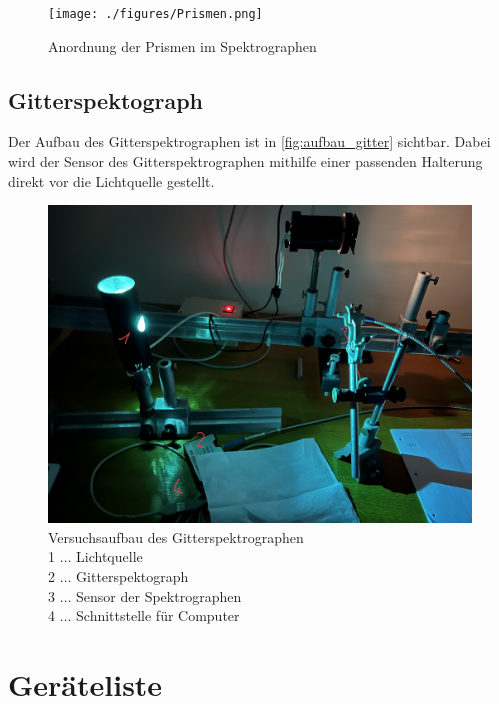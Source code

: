 \documentclass[12pt,english,ngerman]{scrartcl}
\begin{document}
\begin{figure}[H]
	\begin{center}
		\texttt{[image: ./figures/Prismen.png]}
	\end{center}
	\caption[Anordnung der Prismen im Spektrographen] {Anordnung der Prismen im
		Spektrographen
	}\label{fig:prismen}
\end{figure}

\subsection{Gitterspektograph}

Der Aufbau des Gitterspektrographen ist in \autoref{fig:aufbau_gitter}
sichtbar. Dabei wird der Sensor des Gitterspektrographen mithilfe einer
passenden Halterung direkt vor die Lichtquelle gestellt.
\begin{figure}[H]
	\begin{center}
		\includegraphics[width =\textwidth]{./figures/Gitterspektograph.png}
	\end{center}
	\caption[Versuchsaufbau des Gitterspektrographen] {Versuchsaufbau des
		Gitterspektrographen                  \\
		1 \(\dots\) Lichtquelle               \\
		2 \(\dots\) Gitterspektograph         \\
		3 \(\dots\) Sensor der Spektrographen \\
		4 \(\dots\) Schnittstelle für Computer
	}\label{fig:aufbau_gitter}
\end{figure}

\section{Geräteliste}\label{sec:geraeteliste}
\end{document}
